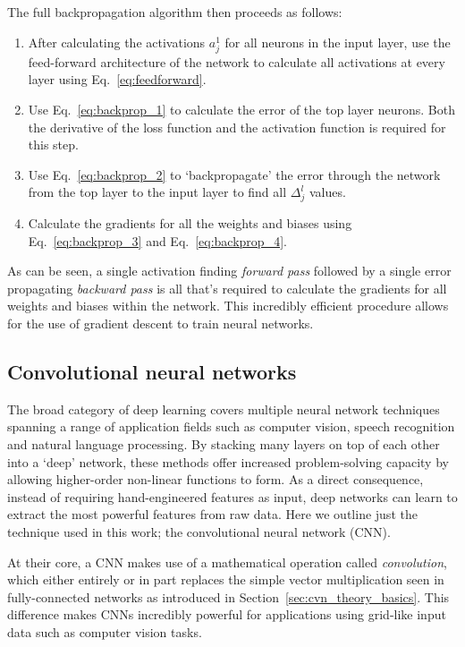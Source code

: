 The full backpropagation algorithm then proceeds as follows:
\begin{enumerate}
    \item After calculating the activations $a^{1}_{j}$ for all neurons in the input layer, use
          the feed-forward architecture of the network to calculate all activations at every layer
          using Eq.~\ref{eq:feedforward}.
    \item Use Eq.~\ref{eq:backprop_1} to calculate the error of the top layer neurons. Both the
          derivative of the loss function and the activation function is required for this step.
    \item Use Eq.~\ref{eq:backprop_2} to `backpropagate' the error through the network from the
          top layer to the input layer to find all $\Delta^{l}_{j}$ values.
    \item Calculate the gradients for all the weights and biases using Eq.~\ref{eq:backprop_3} and
          Eq.~\ref{eq:backprop_4}.
\end{enumerate}
As can be seen, a single activation finding \emph{forward pass} followed by a single error
propagating \emph{backward pass}  is all that's required to calculate the gradients for all
weights and biases within the network. This incredibly efficient procedure allows for the use of
gradient descent to train neural networks.

\subsection{Convolutional neural networks} %
\label{sec:cvn_theory_conv} %

The broad category of deep learning covers multiple neural network techniques spanning a range of
application fields such as computer vision, speech recognition and natural language processing. By
stacking many layers on top of each other into a `deep' network, these methods offer increased
problem-solving capacity by allowing higher-order non-linear functions to form. As a direct
consequence, instead of requiring hand-engineered features as input, deep networks can learn to
extract the most powerful features from raw data. Here we outline just the technique used in this
work; the convolutional neural network (CNN).

At their core, a CNN makes use of a mathematical operation called \emph{convolution}, which either
entirely or in part replaces the simple vector multiplication seen in fully-connected networks as
introduced in Section~\ref{sec:cvn_theory_basics}. This difference makes CNNs incredibly powerful
for applications using grid-like input data such as computer vision tasks.

